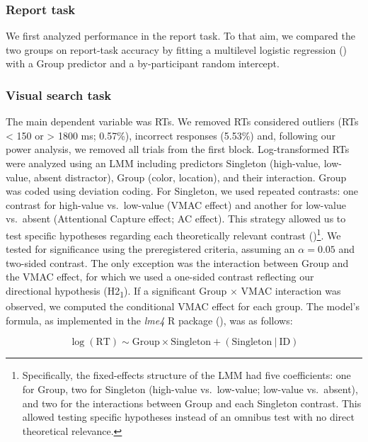 \documentclass[
  man,
  floatsintext,
  longtable,
  nolmodern,
  notxfonts,
  notimes,
  mask,
  colorlinks=true,linkcolor=blue,citecolor=blue,urlcolor=blue]{apa7}
\begin{document}
\subsubsection{Report task}\label{report-task}

We first analyzed performance in the report task. To that aim, we
compared the two groups on report-task accuracy by fitting a multilevel
logistic regression () with a
Group predictor and a by-participant random intercept.

\subsubsection{Visual search task}\label{visual-search-task}

The main dependent variable was RTs. We removed RTs considered outliers
(RTs \textless{} 150 or \textgreater{} 1800 ms; 0.57\%), incorrect
responses (5.53\%) and, following our power analysis, we removed all
trials from the first block. Log-transformed RTs were analyzed using an
LMM including predictors Singleton (high-value, low-value, absent
distractor), Group (color, location), and their interaction. Group was
coded using deviation coding. For Singleton, we used repeated contrasts:
one contrast for high-value vs.~low-value (VMAC effect) and another for
low-value vs.~absent (Attentional Capture effect; AC effect). This
strategy allowed us to test specific hypotheses regarding each
theoretically relevant contrast ()\footnote{Specifically, the fixed-effects structure of the LMM had
  five coefficients: one for Group, two for Singleton (high-value
  vs.~low-value; low-value vs.~absent), and two for the interactions
  between Group and each Singleton contrast. This allowed testing
  specific hypotheses instead of an omnibus test with no direct
  theoretical relevance.}. We tested for significance using the
preregistered criteria, assuming an \(\alpha = 0.05\) and two-sided
contrast. The only exception was the interaction between Group and the
VMAC effect, for which we used a one-sided contrast reflecting our
directional hypothesis (H2\textsubscript{1}). If a significant Group
\(\times\) VMAC interaction was observed, we computed the conditional
VMAC effect for each group. The model's formula, as implemented in the
\emph{lme4} R package (), was as follows:

\[ 
\log(\text{RT}) \sim \text{Group} \times \text{Singleton} + (\text{Singleton} \ | \ \text{ID})
\]
\end{document}
